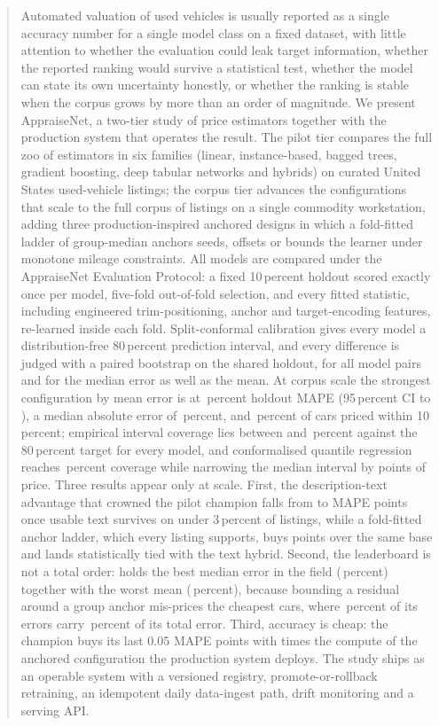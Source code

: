 \documentclass[journal,10pt]{IEEEtran}
\begin{document}
\begin{abstract}
Automated valuation of used vehicles is usually reported as a single accuracy number for a single model class on a fixed dataset, with little attention to whether the evaluation could leak target information, whether the reported ranking would survive a statistical test, whether the model can state its own uncertainty honestly, or whether the ranking is stable when the corpus grows by more than an order of magnitude. We present AppraiseNet, a two-tier study of price estimators together with the production system that operates the result. The pilot tier compares the full zoo of \PilotNModels{} estimators in six families (linear, instance-based, bagged trees, gradient boosting, deep tabular networks and hybrids) on \PilotRows{} curated United States used-vehicle listings; the corpus tier advances the \NModels{} configurations that scale to the full corpus of \NRows{} listings on a single commodity workstation, adding three production-inspired anchored designs in which a fold-fitted ladder of group-median anchors seeds, offsets or bounds the learner under monotone mileage constraints. All models are compared under the AppraiseNet Evaluation Protocol: a fixed 10\,percent holdout scored exactly once per model, five-fold out-of-fold selection, and every fitted statistic, including engineered trim-positioning, anchor and target-encoding features, re-learned inside each fold. Split-conformal calibration gives every model a distribution-free 80\,percent prediction interval, and every difference is judged with a paired bootstrap on the shared holdout, for all \TotalPairs{} model pairs and for the median error as well as the mean. At corpus scale the strongest configuration by mean error is \ChampionName{} at \ChampionMape\,percent holdout MAPE (95\,percent CI \ChampionCILow{} to \ChampionCIHigh), a median absolute error of \ChampionMedian\,percent, and \ChampionWithin\,percent of cars priced within 10\,percent; empirical interval coverage lies between \CovMin{} and \CovMax\,percent against the 80\,percent target for every model, and conformalised quantile regression reaches \CQRCoverage\,percent coverage while narrowing the median interval by \CQRWidthGain{} points of price. Three results appear only at scale. First, the description-text advantage that crowned the pilot champion falls from \PilotTextGain{} to \TextGain{} MAPE points once usable text survives on under 3\,percent of listings, while a fold-fitted anchor ladder, which every listing supports, buys \AnchorGain{} points over the same base and lands statistically tied with the text hybrid. Second, the leaderboard is not a total order: \BestMedianName{} holds the best median error in the field (\BestMedian\,percent) together with the worst mean (\BestMedianMape\,percent), because bounding a residual around a group anchor mis-prices the cheapest cars, where \BestMedianOverTwentyFive\,percent of its errors carry \BestMedianTailShare\,percent of its total error. Third, accuracy is cheap: the champion buys its last 0.05 MAPE points with \CostRatio{} times the compute of the anchored configuration the production system deploys. The study ships as an operable system with a versioned registry, promote-or-rollback retraining, an idempotent daily data-ingest path, drift monitoring and a serving API.

\end{abstract}
\end{document}
